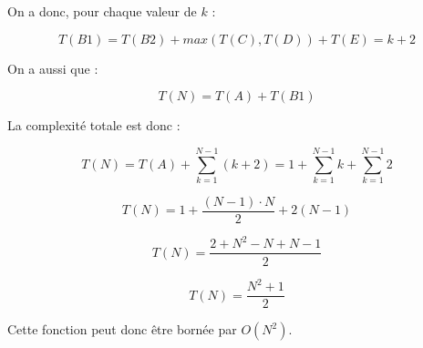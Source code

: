 On a donc, pour chaque valeur de $k$ :

\[
T(B1) = T(B2) + max(T(C), T(D)) + T(E) = k + 2
\]

On a aussi que :

\[
T(N) = T(A) + T(B1)
\]

La complexité totale est donc :

\[
T(N) = T(A) + \sum_{k = 1}^{N-1} (k + 2) = 1 + \sum_{k = 1}^{N-1} k + \sum_{k = 1}^{N-1} 2
\]

\[
T(N) = 1 + \frac{(N - 1) \cdot N}{2} + 2(N - 1)
\]

\[
T(N) = \frac{2 + N^{2} - N + N - 1}{2}
\]

\[
T(N) = \frac{N^{2} + 1}{2}
\]

Cette fonction peut donc être bornée par $O(N^2)$.
